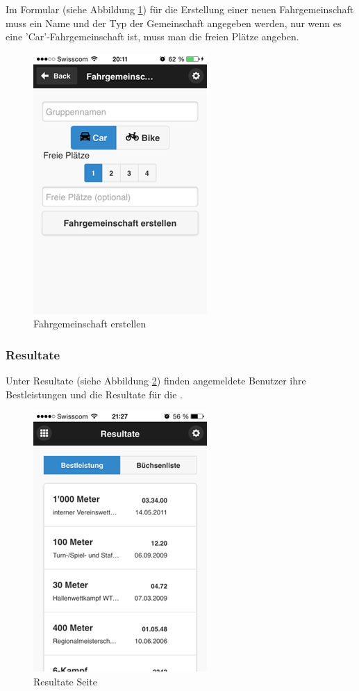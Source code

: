 Im Formular (siehe Abbildung \ref{fig:app_add_carpool}) für die Erstellung einer neuen Fahrgemeinschaft muss ein Name und der Typ der Gemeinschaft angegeben werden, nur wenn es eine 'Car'-Fahrgemeinschaft ist, muss man die freien Plätze angeben.

\begin{figure}[h]
\centering
\includegraphics[scale=0.5]{images/app/add_carpool.png}
\caption{Fahrgemeinschaft erstellen}
\label{fig:app_add_carpool}
\end{figure}


\newpage
\FloatBarrier
\subsubsection{Resultate}
Unter Resultate (siehe Abbildung \ref{fig:app_results}) finden angemeldete Benutzer ihre Bestleistungen und die Resultate für die .
\begin{figure}[h]
\centering
\includegraphics[scale=0.5]{images/app/results.png}
\caption{Resultate Seite}
\label{fig:app_results}
\end{figure}


